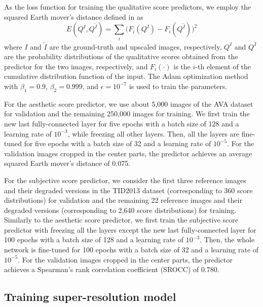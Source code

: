 \documentclass[runningheads]{llncs}
\begin{document}
As the loss function for training the qualitative score predictors, we employ the squared Earth mover's distance defined in \cite{hou2016squared} as
\begin{equation}
\label{eq:squared_earth_movers_distance}
{E}( {Q}^{I}, {Q}^{\widetilde{I}} ) = \sum_{i} \Big( {F}_{i}({Q}^{I}) - {F}_{i}({Q}^{\widetilde{I}}) \Big) ^{2}
\end{equation}
where $I$ and $\widetilde{I}$ are the ground-truth and upscaled images, respectively, ${Q}^{I}$ and ${Q}^{\widetilde{I}}$ are the probability distributions of the qualitative scores obtained from the predictor for the two images, respectively, and ${F}_{i}( \cdot )$ is the $i$-th element of the cumulative distribution function of the input.
The Adam optimization method \cite{kingma2014adam} with $\beta_{1}=0.9$, $\beta_{2}=0.999$, and $\epsilon={10}^{-7}$ is used to train the parameters.

For the aesthetic score predictor, we use about 5,000 images of the AVA dataset \cite{murray2012ava} for validation and the remaining 250,000 images for training.
We first train the new last fully-connected layer for five epochs with a batch size of 128 and a learning rate of ${10}^{-3}$, while freezing all other layers.
Then, all the layers are fine-tuned for five epochs with a batch size of 32 and a learning rate of ${10}^{-5}$.
For the validation images cropped in the center parts, the predictor achieves an average squared Earth mover's distance of 0.075. 

For the subjective score predictor, we consider the first three reference images and their degraded versions in the TID2013 dataset \cite{ponomarenko2015image} (corresponding to 360 score distributions) for validation and the remaining 22 reference images and their degraded versions (corresponding to 2,640 score distributions) for training.
Similarly to the aesthetic score predictor, we first train the subjective score predictor with freezing all the layers except the new last fully-connected layer for 100 epochs with a batch size of 128 and a learning rate of ${10}^{-3}$.
Then, the whole network is fine-tuned for 100 epochs with a batch size of 32 and a learning rate of ${10}^{-5}$.
For the validation images cropped in the center parts, the predictor achieves a Spearman's rank correlation coefficient (SROCC) of 0.780.


\subsection{Training super-resolution model}
\label{sec:training_perceptual_sr}
\end{document}
